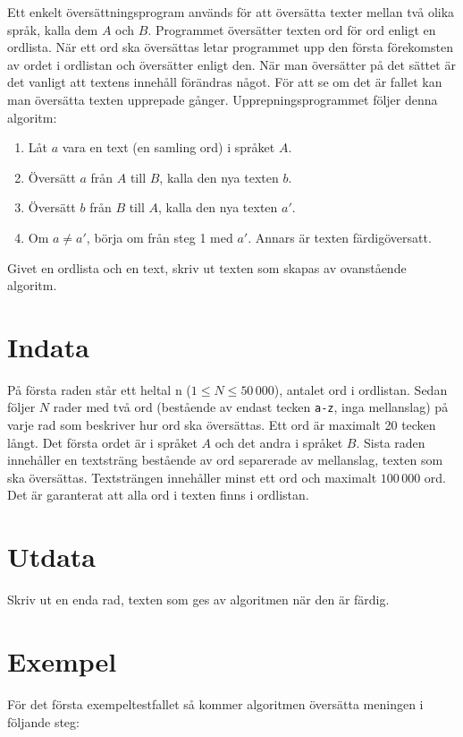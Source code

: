 Ett enkelt översättningsprogram används för att översätta texter mellan två
olika språk, kalla dem $A$ och $B$. Programmet översätter texten ord för ord enligt
en ordlista. När ett ord ska översättas letar programmet upp den första
förekomsten av ordet i ordlistan och översätter enligt den. När man översätter
på det sättet är det vanligt att textens innehåll förändras något. För att se
om det är fallet kan man översätta texten upprepade gånger. Upprepningsprogrammet
följer denna algoritm:

\begin{enumerate}
    \item Låt $a$ vara en text (en samling ord) i språket $A$.
    \item Översätt $a$ från $A$ till $B$, kalla den nya texten $b$.
    \item Översätt $b$ från $B$ till $A$, kalla den nya texten $a'$.
    \item Om $a \not = a'$, börja om från steg 1 med $a'$. Annars är texten färdigöversatt.
\end{enumerate}

Givet en ordlista och en text, skriv ut texten som skapas av ovanstående algoritm.

\section*{Indata}
På första raden står ett heltal n ($1 \leq N \leq 50\,000$), antalet ord i ordlistan.
Sedan följer $N$ rader med två ord (bestående av endast tecken \texttt{a-z},
inga mellanslag) på varje rad som beskriver hur ord ska översättas. Ett ord är maximalt 20 tecken långt.
Det första ordet är i språket $A$ och det andra i språket $B$. Sista raden innehåller en textsträng
bestående av ord separerade av mellanslag, texten som ska översättas. Textsträngen innehåller minst ett ord och
maximalt $100\,000$ ord. Det är garanterat
att alla ord i texten finns i ordlistan.

\section*{Utdata}
Skriv ut en enda rad, texten som ges av algoritmen när den är färdig.

\section*{Exempel}
För det första exempeltestfallet så kommer algoritmen översätta meningen i följande steg:

